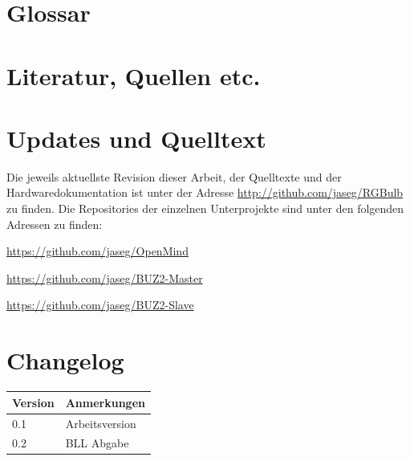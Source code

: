 \documentclass[12pt,a4paper,notitlepage]{article}
\begin{document}
\appendix
\section{Glossar}
\glsaddall
\printglossary[type=\acronymtype,title={Abkürzungen}]
\printglossary[title={Begriffserklärungen}]
\section{Literatur, Quellen etc.}
\nocite{STELTZ1}
\nocite{TEXAS2,TEXAS3,TEXAS4,TEXAS5,TEXAS6,TEXAS7,TEXAS8,TEXAS9}
\nocite{MAXIM46,MAXIM48}
\nocite{MAXIM75,MAXIM73,MAXIM72,MAXIM71,MAXIM69,MAXIM68,MAXIM67,MAXIM66,MAXIM65,MAXIM62,MAXIM57,MAXIM54,MAXIM53,MAXIM51,MAXIM47}
\nocite{MAXIM50}

\renewcommand{\refname}{}

\section{Updates und Quelltext}
\begin{center}

\begin{minipage}{11cm}
\begin{center}
\sffamily%
\vspace{2mm}
Die jeweils aktuellste Revision dieser Arbeit, der Quelltexte und der Hardwaredokumentation ist unter der Adresse 
\url{http://github.com/jaseg/RGBulb} zu finden. Die Repositories der einzelnen Unterprojekte sind unter den folgenden Adressen zu finden:
\begin{description}
\item \url{https://github.com/jaseg/OpenMind}
\item \url{https://github.com/jaseg/BUZ2-Master}
\item \url{https://github.com/jaseg/BUZ2-Slave}
\end{description}
\vspace{2mm}
\end{center}
\end{minipage}

\end{center}
\section{Changelog}
\begin{tabularx}{\textwidth}{l|l}
\textbf{Version}&\textbf{Anmerkungen}\\\hline
0.1&Arbeitsversion\\
0.2&BLL Abgabe
\end{tabularx}
\end{document}
